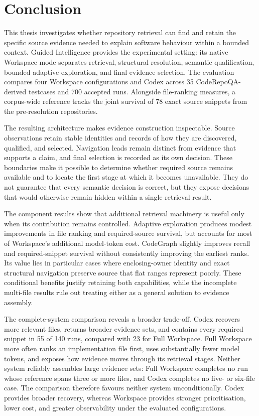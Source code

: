 \chapter{Conclusion}\label{ch:conclusion}

This thesis investigates whether repository retrieval can find and retain the specific source evidence needed to explain software behaviour within a bounded context. Guided Intelligence provides the experimental setting: its native Workspace mode separates retrieval, structural resolution, semantic qualification, bounded adaptive exploration, and final evidence selection. The evaluation compares four Workspace configurations and Codex across 35 CodeRepoQA-derived testcases and 700 accepted runs. Alongside file-ranking measures, a corpus-wide reference tracks the joint survival of 78 exact source snippets from the pre-resolution repositories.

The resulting architecture makes evidence construction inspectable. Source observations retain stable identities and records of how they are discovered, qualified, and selected. Navigation leads remain distinct from evidence that supports a claim, and final selection is recorded as its own decision. These boundaries make it possible to determine whether required source remains available and to locate the first stage at which it becomes unavailable. They do not guarantee that every semantic decision is correct, but they expose decisions that would otherwise remain hidden within a single retrieval result.

The component results show that additional retrieval machinery is useful only when its contribution remains controlled. Adaptive exploration produces modest improvements in file ranking and required-source survival, but accounts for most of Workspace's additional model-token cost. CodeGraph slightly improves recall and required-snippet survival without consistently improving the earliest ranks. Its value lies in particular cases where enclosing-owner identity and exact structural navigation preserve source that flat ranges represent poorly. These conditional benefits justify retaining both capabilities, while the incomplete multi-file results rule out treating either as a general solution to evidence assembly.

The complete-system comparison reveals a broader trade-off. Codex recovers more relevant files, returns broader evidence sets, and contains every required snippet in 55 of 140 runs, compared with 23 for Full Workspace. Full Workspace more often ranks an implementation file first, uses substantially fewer model tokens, and exposes how evidence moves through its retrieval stages. Neither system reliably assembles large evidence sets: Full Workspace completes no run whose reference spans three or more files, and Codex completes no five- or six-file case. The comparison therefore favours neither system unconditionally. Codex provides broader recovery, whereas Workspace provides stronger prioritisation, lower cost, and greater observability under the evaluated configurations.

